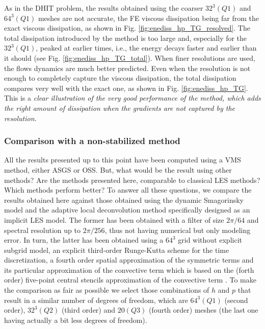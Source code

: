 As in the DHIT problem, the results obtained using the coarser $32^3 (Q1)$ and $64^3 (Q1)$ meshes are not accurate, the FE viscous dissipation being far from the exact viscous dissipation, as shown in Fig. \ref{fig:enediss_hp_TG_resolved}. The total dissipation introduced by the method is too large and, especially for the $32^3 (Q1)$, peaked at earlier times, i.e., the energy decays faster and earlier than it should (see Fig. \ref{fig:enediss_hp_TG_total}). When finer resolutions are used, the flows dynamics are much better predicted. Even when the resolution is not enough to completely capture the viscous dissipation, the total dissipation compares very well with the exact one, as shown in  Fig. \ref{fig:enediss_hp_TG}. This is a \emph{clear illustration of the very good performance of the method, which adds the right amount of dissipation when the gradients are not captured by the resolution.}

\subsubsection{Comparison with a non-stabilized method}

All the results presented up to this point have been computed using a VMS method, either ASGS or OSS. But, what would be the result using other methods? Are the methods presented here, comparable to classical LES methods? Which methods perform better? To answer all these questions, we compare the results obtained here against those obtained using the dynamic Smagorinsky model \cite{fauconnier_construction_2009} and the adaptive local deconvolution method \cite{hickel_adaptive_2006} specifically designed as an implicit LES model. The former has been obtained with a filter of size $2 \pi / 64$ and spectral resolution up to $2 \pi / 256$, thus not having numerical but only modeling error. In turn, the latter has been obtained using a $64^3$ grid without explicit subgrid model, an explicit third-order Runge-Kutta scheme for the time discretization, a fourth order spatial approximation of the symmetric terms and its particular approximation of the convective term which is based on the (forth order) five-point central stencils approximation of the convective term \cite{hickel_adaptive_2006}. To make the comparison as fair as possible we select those combinations of $h$ and $p$ that result in a similar number of degrees of freedom, which are $64^3 (Q1)$ (second order), $32^3 (Q2)$ (third order) and $20 (Q3)$ (fourth order) meshes (the last one having actually a bit less degrees of freedom).

